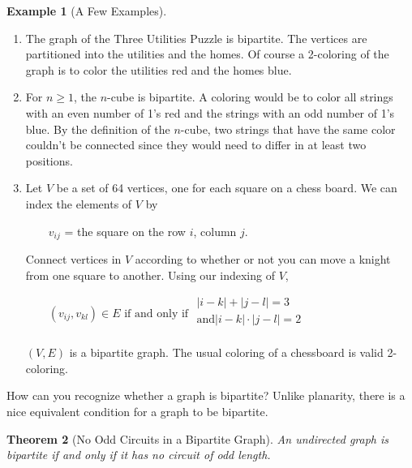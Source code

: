 \documentclass[10pt,]{book}
\theoremstyle{plain}
\newtheorem{theorem}{Theorem}[section]
\theoremstyle{definition}
\theoremstyle{definition}
\theoremstyle{definition}
\newtheorem{example}[theorem]{Example}
\theoremstyle{definition}
\theoremstyle{definition}
\numberwithin{equation}{section}
\begin{document}
\begin{example}[A Few Examples]\label{ex-bipartite}
\leavevmode%
\begin{enumerate}[label=\alph*]
\item\hypertarget{li-131}{} The graph of the Three Utilities Puzzle is bipartite. The vertices are partitioned into the utilities and the homes. Of course a 2-coloring of
the graph is to color the utilities red and the homes blue.%
\item\hypertarget{li-132}{}For \(n\geq 1\), the \(n\)-cube is bipartite. A coloring would be to color all strings with an even number of 1's red and the strings with
an odd number of 1's blue. By the definition of the \(n\)-cube, two strings that have the same color couldn't be connected since they would
need to differ in at least two positions.%
\item\hypertarget{li-133}{}Let \(V\) be a set of 64 vertices, one for each square on a chess board. We can index the elements of \(V\) by

 \(\quad \quad\)\(v_{i j}\) = the square on the row \(i\), column \(j\). 

Connect vertices in \(V\) according to whether or not you can move a knight from one square to another. Using our indexing of \(V\),

\(\quad \quad\)\(\left(v_{i j}, v_{k l}\right)\in  E\text{ if and only if      }
\begin{array}{c}
 |i-k|+|j-l|=3 \\
 \text{and} |i-k|\cdot |j-l|=2 \\
\end{array}\)

\((V, E)\) is a bipartite graph. The usual coloring of a chessboard is valid 2-coloring.%
\end{enumerate}
%
\end{example}
\par
How can you recognize whether a graph is bipartite? Unlike planarity, there is a nice equivalent condition for a graph to be bipartite.%
\begin{theorem}[No Odd Circuits in a Bipartite Graph]\label{theorem-no-odd}
An undirected graph is bipartite if and only if it has no circuit of odd length.%
\end{theorem}
\end{document}
